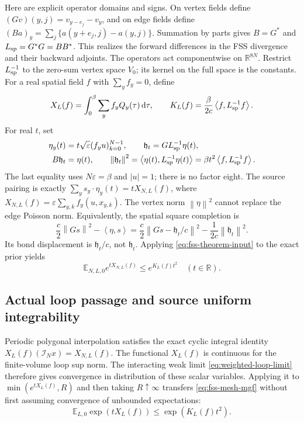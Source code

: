 \documentclass[11pt]{article}
\numberwithin{equation}{section}
\theoremstyle{definition}
\newcommand{\R}{\mathbb R}
\newcommand{\E}{\mathbb E}
\newcommand{\dd}{\,\mathrm d}
\newcommand{\norm}[1]{\left\lVert#1\right\rVert}
\newcommand{\ip}[2]{\left\langle#1,#2\right\rangle}
\newcommand{\eps}{\varepsilon}
\begin{document}
Here are explicit operator domains and signs.  On vertex fields define
$(Gv)(y,j)=v_{y-e_j}-v_y$, and on edge fields define
$(Ba)_y=\sum_j\{a(y+e_j,j)-a(y,j)\}$.  Summation by parts gives
$B=G^*$ and $L_{\rm sp}=G^*G=BB^*$.  This realizes the forward
differences in the FSS divergence and their backward adjoints.  The operators
act componentwise on $\R^{8N}$.  Restrict $L_{\rm sp}^{-1}$ to the
zero-sum vertex space $V_0$; its kernel on the full space is the constants.
For a real spatial field $f$ with $\sum_yf_y=0$, define
\begin{equation}
 X_L(f)=\int_0^\beta\sum_y f_yQ_y(\tau)\dd\tau,\qquad
 K_L(f)=\frac\beta{2c}\ip{f}{L_{\rm sp}^{-1}f}. \label{eq:fss-source}
\end{equation}
For real $t$, set
\begin{align}
 \eta_y(t)&=t\sqrt\eps(f_yu)_{k=0}^{N-1},\qquad
 \mathfrak h_t=G L_{\rm sp}^{-1}\eta(t),\nonumber\\
 B\mathfrak h_t&=\eta(t),\qquad
 \norm{\mathfrak h_t}^2=\ip{\eta(t)}{L_{\rm sp}^{-1}\eta(t)}
        =\beta t^2\ip f{L_{\rm sp}^{-1}f}.
 \label{eq:fss-poisson-energy}
\end{align}
The last equality uses $N\eps=\beta$ and $|u|=1$; there is no factor
eight.  The source pairing is exactly
$\sum_y s_y\cdot\eta_y(t)=tX_{N,L}(f)$, where
$X_{N,L}(f)=\eps\sum_{y,k}f_y(u,x_{y,k})$.
The vertex norm $\norm\eta^2$ cannot replace the edge Poisson norm.
Equivalently, the spatial square completion is
\begin{equation}
 \frac c2\norm{Gs}^2-\ip\eta s
 =\frac c2\norm{Gs-\mathfrak h_t/c}^2
                        -\frac1{2c}\norm{\mathfrak h_t}^2.
 \label{eq:fss-square-shift}
\end{equation}
Its bond displacement is $\mathfrak h_t/c$, not $\mathfrak h_t$.
Applying \eqref{eq:fss-theorem-input} to the exact prior yields
\begin{equation}
 \E_{N,L,0}e^{tX_{N,L}(f)}\leq e^{K_L(f)t^2}
       \quad(t\in\R).
 \label{eq:fss-mesh-mgf}
\end{equation}

\subsection{Actual loop passage and source uniform integrability}
\label{sec:fss-loop-passage}

Periodic polygonal interpolation satisfies the exact cyclic integral identity
$X_L(f)(\mathcal I_Nx)=X_{N,L}(f)$.  The functional $X_L(f)$ is
continuous for the finite-volume loop sup norm.  The interacting weak limit
\eqref{eq:weighted-loop-limit} therefore gives convergence in distribution
of these scalar variables.  Applying it to
$\min(e^{tX_L(f)},R)$ and then taking $R\uparrow\infty$ transfers
\eqref{eq:fss-mesh-mgf} without first assuming convergence of unbounded
expectations:
\begin{equation}
 \E_{L,0}\exp(tX_L(f))\leq\exp(K_L(f)t^2). \label{eq:fss-mgf}
\end{equation}
\end{document}
